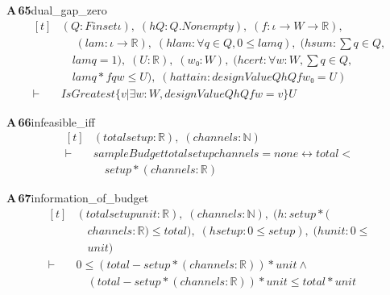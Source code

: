 \documentclass[conference]{IEEEtran}
\theoremstyle{definition}
\newcommand{\lean}[1]{\textsf{\footnotesize #1}}
\begin{document}
\noindent\textbf{A\,65}\quad\lean{dual\_gap\_zero}
{\footnotesize\[ \begin{aligned}[t]
&(\mathit{Q} : \mathit{Finset} \iota ),\; (\mathit{hQ} : \mathit{Q}.\mathit{Nonempty}),\; (\mathit{f} : \iota \to \mathit{W} \to \mathbb{R} ),\\
&\quad \; (\mathit{lam} : \iota \to \mathbb{R} ),\; (\mathit{hlam} : \forall \mathit{q} \in \mathit{Q}, 0 \leq \mathit{lam} \mathit{q}),\; (\mathit{hsum} : \textstyle\sum \mathit{q} \in \mathit{Q},\\
&\quad \mathit{lam} \mathit{q} = 1),\; (\mathit{U} : \mathbb{R} ),\; (\mathit{w₀} : \mathit{W}),\; (\mathit{hcert} : \forall \mathit{w} : \mathit{W}, \textstyle\sum \mathit{q} \in \mathit{Q},\\
&\quad \mathit{lam} \mathit{q} * \mathit{f} \mathit{q} \mathit{w} \leq \mathit{U}),\; (\mathit{hattain} : \mathit{designValue} \mathit{Q} \mathit{hQ} \mathit{f} \mathit{w₀} = \mathit{U})\\
\vdash\;&\mathit{IsGreatest} \{ \mathit{v} | \exists \mathit{w} : \mathit{W}, \mathit{designValue} \mathit{Q} \mathit{hQ} \mathit{f} \mathit{w} = \mathit{v}\} \mathit{U}
\end{aligned} \]}

\noindent\textbf{A\,66}\quad\lean{infeasible\_iff}
{\footnotesize\[ \begin{aligned}[t]
&(\mathit{total} \mathit{setup} : \mathbb{R} ),\; (\mathit{channels} : \mathbb{N} )\\
\vdash\;&\mathit{sampleBudget} \mathit{total} \mathit{setup} \mathit{channels} = \mathit{none} \leftrightarrow \mathit{total} <\\
&\quad \mathit{setup} * (\mathit{channels} : \mathbb{R} )
\end{aligned} \]}

\noindent\textbf{A\,67}\quad\lean{information\_of\_budget}
{\footnotesize\[ \begin{aligned}[t]
&(\mathit{total} \mathit{setup} \mathit{unit} : \mathbb{R} ),\; (\mathit{channels} : \mathbb{N} ),\; (\mathit{h} : \mathit{setup} * (\\
&\quad \mathit{channels} : \mathbb{R} ) \leq \mathit{total}),\; (\mathit{hsetup} : 0 \leq \mathit{setup}),\; (\mathit{hunit} : 0 \leq\\
&\quad \mathit{unit})\\
\vdash\;&0 \leq (\mathit{total} - \mathit{setup} * (\mathit{channels} : \mathbb{R} )) * \mathit{unit} \wedge\\
&\quad (\mathit{total} - \mathit{setup} * (\mathit{channels} : \mathbb{R} )) * \mathit{unit} \leq \mathit{total} * \mathit{unit}
\end{aligned} \]}
\end{document}
